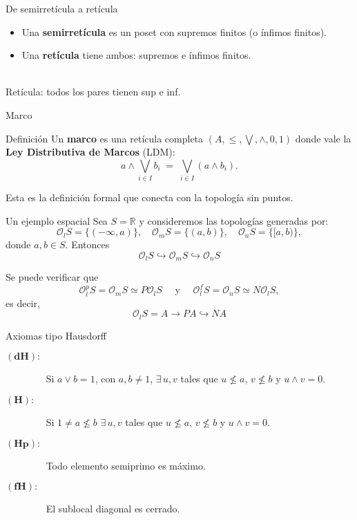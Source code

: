 \documentclass[compress,12pt]{beamer}
\begin{document}
\begin{frame}{De semirretícula a retícula}
  \begin{itemize}
    \item Una \textbf{semirretícula} es un poset con supremos finitos (o ínfimos finitos).
    \item Una \textbf{retícula} tiene ambos: supremos e ínfimos finitos.
  \end{itemize}
  \vspace{0.8em}
  \centering
  \\
  \scriptsize Retícula: todos los pares tienen sup e inf.
\end{frame}

\begin{frame}{Marco}
  \begin{block}{Definición}
    Un \textbf{marco} es una retícula completa $(A, \leq, \bigvee, \wedge, 0, 1)$
    donde vale la \textbf{Ley Distributiva de Marcos} (LDM):
    \[
      a \wedge \bigvee_{i \in I} b_i \;=\; \bigvee_{i \in I}(a \wedge b_i).
    \]
  \end{block}
  \vspace{0.8em}
  \centering
  \scriptsize Esta es la definición formal que conecta con la topología sin puntos.
\end{frame}

\begin{frame}[fragile]{Un ejemplo espacial}
Sea $S=\mathbb{R}$ y consideremos las topologías generadas por:
\[
\mathcal{O}_lS=\{(-\infty, a)\},\quad  \mathcal{O}_mS=\{(a,b)\}, \quad \mathcal{O}_nS=\{[a,b)\},
\]
donde $a,b\in S$. Entonces
\[
\mathcal{O}_lS \hookrightarrow \mathcal{O}_mS \hookrightarrow \mathcal{O}_nS
\]

Se puede verificar que 
\[
\mathcal{O}_l^pS=\mathcal{O}_mS\simeq P\mathcal{O}_lS\quad\mbox{ y }\quad\mathcal{O}_l^fS=\mathcal{O}_nS\simeq N\mathcal{O}_lS,
\]
es decir, 
\[
\mathcal{O}_lS=A\rightarrow PA\hookrightarrow NA
\]
\end{frame}

\begin{frame}{Axiomas tipo Hausdorff}
    \begin{description}
        \item[$\mathbf{(dH):}$]$\quad$ Si $a\vee b=1$, con $a,b\neq 1$, $\exists\, u,v$ tales que $u\nleq a$, $v\nleq b$ y $u\wedge v=0$.
        \item[$\mathbf{(H):}$]$\quad$ Si $1\neq a\nleq b$ $\exists\, u, v$ tales que $u\nleq a$, $v\nleq b$ y $u\wedge v=0$.
        \item[$\mathbf{(Hp):}$]$\quad$ Todo elemento semiprimo es máximo.
        \item[$\mathbf{(fH):}$]$\quad$ El sublocal diagonal es cerrado.
    \end{description}
\end{frame}
\end{document}
